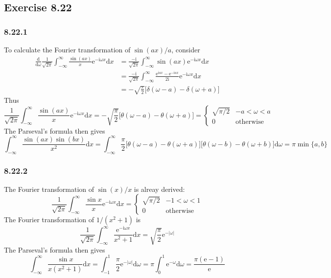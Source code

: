 \documentclass[]{ctexart}
\begin{document}
\subsection{Exercise 8.22}
\subsubsection*{8.22.1}
To calculate the Fourier transformation of $\sin(ax)/a$, consider
\begin{align*}
\frac{\mathrm{d}}{\mathrm{d}\omega}\frac{1}{\sqrt{2\pi}}\int_{-\infty}^\infty\frac{\sin(ax)}{x}\mathrm{e}^{-\mathrm{i}\omega x}\mathrm{d}x&=\frac{-\mathrm{i}}{\sqrt{2\pi}}\int_{-\infty}^\infty\sin(ax)\mathrm{e}^{-\mathrm{i}\omega x}\mathrm{d}x\\
&=\frac{-\mathrm{i}}{\sqrt{2\pi}}\int_{-\infty}^\infty\frac{\mathrm{e}^{\mathrm{i}ax}-\mathrm{e}^{-\mathrm{i}ax}}{2\mathrm{i}}\mathrm{e}^{-\mathrm{i}\omega x}\mathrm{d}x\\
&=-\sqrt{\frac{\pi}{2}}\big[\delta(\omega-a)-\delta(\omega+a)\big]
\end{align*}
Thus 
\begin{equation*}
\frac{1}{\sqrt{2\pi}}\int_{-\infty}^\infty\frac{\sin(ax)}{x}\mathrm{e}^{-\mathrm{i}\omega x}\mathrm{d}x=-\sqrt{\frac{\pi}{2}}\big[\theta(\omega-a)-\theta(\omega+a)\big]=\begin{cases}
\sqrt{\pi/2} & -a<\omega<a\\
0 & \text{otherwise}
\end{cases}
\end{equation*}
The Parseval's formula then gives 
\begin{equation*}
\int_{-\infty}^\infty\frac{\sin(ax)\sin(bx)}{x^2}\mathrm{d}x=\int_{-\infty}^\infty\frac{\pi}{2}\big[\theta(\omega-a)-\theta(\omega+a)\big]\big[\theta(\omega-b)-\theta(\omega+b)\big]\mathrm{d}\omega=\pi\min\{a,b\}
\end{equation*}

\subsubsection*{8.22.2}
The Fourier transformation of $\sin(x)/x$ is alreay derived: 
\begin{equation*}
\frac{1}{\sqrt{2\pi}}\int_{-\infty}^\infty\frac{\sin x}{x}\mathrm{e}^{-\mathrm{i}\omega x}\mathrm{d}x=\begin{cases}
\sqrt{\pi/2} & -1<\omega<1\\
0 & \text{otherwise}
\end{cases}
\end{equation*}
The Fourier transformation of $1/(x^2+1)$ is 
\begin{equation*}
\frac{1}{\sqrt{2\pi}}\int_{-\infty}^\infty\frac{\mathrm{e}^{-\mathrm{i}\omega x}}{x^2+1}\mathrm{d}x=\sqrt{\frac{\pi}{2}}\mathrm{e}^{-|\omega|}
\end{equation*}
The Parseval's formula then gives 
\begin{equation*}
\int_{-\infty}^\infty\frac{\sin x}{x(x^2+1)}\mathrm{d}x=\int_{-1}^1\frac{\pi}{2}\mathrm{e}^{-|\omega|}\mathrm{d}\omega=\pi\int_0^1\mathrm{e}^{-\omega}\mathrm{d}\omega=\frac{\pi(\mathrm{e}-1)}{\mathrm{e}}
\end{equation*}
\end{document}
